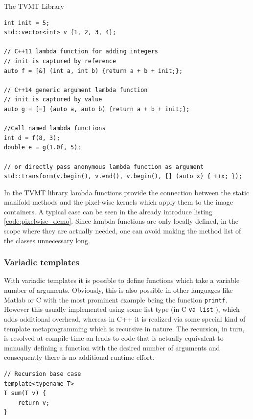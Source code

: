 \begin{chapter}{The TVMT Library}
\cppinline
\begin{lstlisting}[label=code:lambdafun,caption={Lambda functions}]
int init = 5;
std::vector<int> v {1, 2, 3, 4};

// C++11 lambda function for adding integers
// init is captured by reference
auto f = [&] (int a, int b) {return a + b + init;};

// C++14 generic argument lambda function
// init is captured by value
auto g = [=] (auto a, auto b) {return a + b + init;};

//Call named lambda functions
int d = f(8, 3);
double e = g(1.0f, 5);

// or directly pass anonymous lambda function as argument
std::transform(v.begin(), v.end(), v.begin(), [] (auto x) { ++x; });
\end{lstlisting}

In the TVMT library lambda functions provide the connection between the static manifold methods and the pixel-wise kernels which apply them to the image containers.
A typical case can be seen in the already introduce listing \ref{code:pixelwise_demo}. Since lambda functions are only locally defined, in the scope where they are actually needed,
one can avoid making the method list of the classes unnecessary long.

\subsubsection{Variadic templates} %
\label{ssub:Variadic templates}
With variadic templates it is possible to define functions which take a variable number of arguments. Obviously, this is also possible in other languages like Matlab or
C with the most prominent example being the function \texttt{printf}. However this usually implemented using some list type (in C \texttt{va\_list} ), which adds additional 
overhead, whereas in C++ it is realized via some special kind of template metaprogramming which is recursive in nature. The recursion, in turn, is resolved at compile-time
an leads to code that is actually equivalent to manually defining a function with the desired number of arguments and consequently there is no additional runtime effort.\\

\cppinline
\begin{lstlisting}[label=code:variadic,caption={Variadic template example}]
// Recursion base case
template<typename T>
T sum(T v) {
    return v;
}


\end{lstlisting}
\end{chapter}
